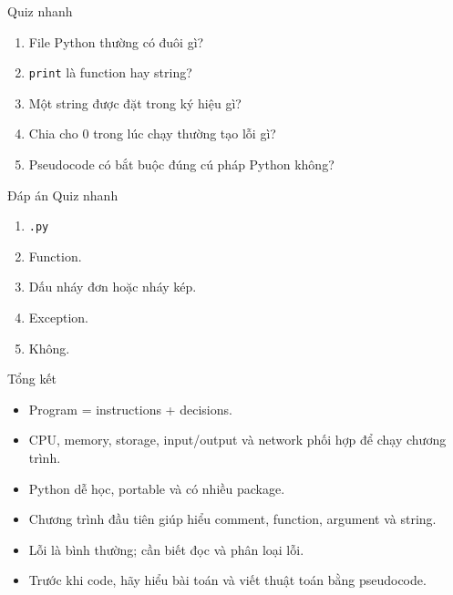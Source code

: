 \documentclass[aspectratio=169,10pt]{beamer}
\begin{document}
\begin{frame}{Quiz nhanh}
\begin{enumerate}
  \item File Python thường có đuôi gì?
  \item \texttt{print} là function hay string?
  \item Một string được đặt trong ký hiệu gì?
  \item Chia cho 0 trong lúc chạy thường tạo lỗi gì?
  \item Pseudocode có bắt buộc đúng cú pháp Python không?
\end{enumerate}
\end{frame}

\begin{frame}{Đáp án Quiz nhanh}
\begin{enumerate}
  \item \texttt{.py}
  \item Function.
  \item Dấu nháy đơn hoặc nháy kép.
  \item Exception.
  \item Không.
\end{enumerate}
\end{frame}

\begin{frame}{Tổng kết}
\begin{itemize}
  \item Program = instructions + decisions.
  \item CPU, memory, storage, input/output và network phối hợp để chạy chương trình.
  \item Python dễ học, portable và có nhiều package.
  \item Chương trình đầu tiên giúp hiểu comment, function, argument và string.
  \item Lỗi là bình thường; cần biết đọc và phân loại lỗi.
  \item Trước khi code, hãy hiểu bài toán và viết thuật toán bằng pseudocode.
\end{itemize}
\end{frame}
\end{document}
